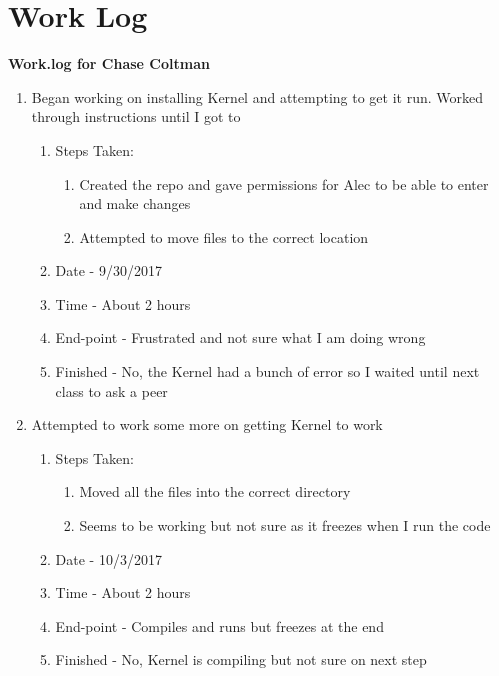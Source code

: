 \documentclass[journal,10pt,onecolumn,compsoc]{IEEEtran} \usepackage[margin=1.0in]{geometry} \usepackage{pdfpages}
\begin{document}
\section {Work Log}
\textbf{Work.log for Chase Coltman}
\begin{enumerate}	
	\item Began working on installing Kernel and attempting to get it run. Worked through instructions until I got to
		\begin{enumerate}[label=(\Alph*)]
			\item Steps Taken:
				\begin{enumerate}[label=(\alph*)]
					\item Created the repo and gave permissions for Alec to be able to enter and make changes
					\item Attempted to move files to the correct location
				\end{enumerate}
			\item Date - 9/30/2017
			\item Time - About 2 hours
			\item End-point - Frustrated and not sure what I am doing wrong
			\item Finished - No, the Kernel had a bunch of error so I waited until next class to ask a peer
		\end {enumerate}
		
	\item Attempted to work some more on getting Kernel to work
		\begin{enumerate}[label=(\Alph*)]
			\item Steps Taken:
				\begin{enumerate}[label=(\alph*)]
					\item Moved all the files into the correct directory
					\item Seems to be working but not sure as it freezes when I run the code
				\end{enumerate}
			\item Date - 10/3/2017
			\item Time - About 2 hours
			\item End-point - Compiles and runs but freezes at the end
			\item Finished -  No, Kernel is compiling but not sure on next step
		\end {enumerate}
		

\end{enumerate}
\end{document}

